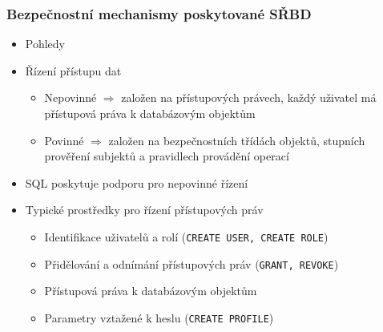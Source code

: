 \documentclass[a4paper,10pt]{article}
\newcommand{\tedy}{$\Rightarrow$ }
\begin{document}
			\subsubsection{Bezpečnostní mechanismy poskytované SŘBD}
				\begin{itemize}
					\item Pohledy
					\item Řízení přístupu dat
					\begin{itemize}
						\item Nepovinné \tedy založen na přístupových právech, každý uživatel má přístupová práva k databázovým objektům
						\item Povinné \tedy založen na bezpečnostních třídách objektů, stupních prověření subjektů a pravidlech provádění operací
					\end{itemize}
					\item SQL poskytuje podporu pro nepovinné řízení
					\item Typické prostředky pro řízení přístupových práv
					\begin{itemize}
						\item Identifikace uživatelů a rolí (\texttt{CREATE USER, CREATE ROLE})
						\item Přidělování a odnímání přístupových práv (\texttt{GRANT, REVOKE})
						\item Přístupová práva k databázovým objektům
						\item Parametry vztažené k heslu (\texttt{CREATE PROFILE})
					\end{itemize}
				\end{itemize}
		
\end{document}
